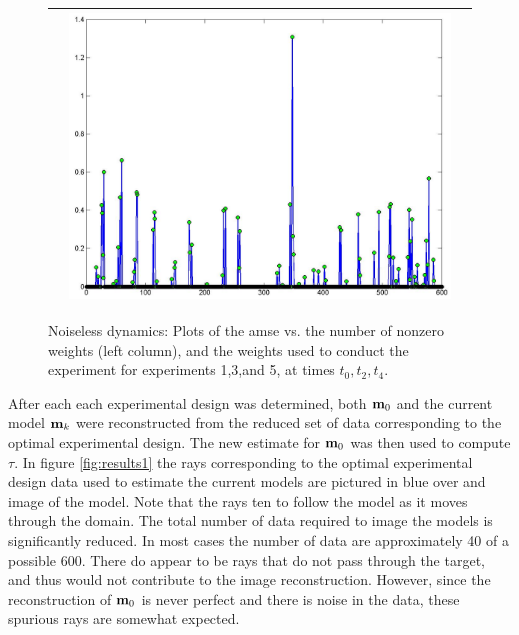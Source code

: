 \documentclass[11pt]{article}
\newcommand{\bfm}	{{\bf{m}}}
\begin{document}
\begin{figure}[!h]
\begin{center}
\begin{tabular}{|c|c|c|}
			&
			\includegraphics[width=.8\iwidth]{figures/newFigs/exp5Weights}\\			
			\hline
		\end{tabular}
	\end{center}
	\caption{Noiseless dynamics: Plots of the {\sf amse} vs. the number of nonzero weights (left column), and the weights used to conduct the experiment for experiments 1,3,and 5, at times $t_0,t_2,t_4$.}
	\label{fig:weights1}
\end{figure}

After each each experimental design was determined, both $\bfm_0$ and the current model $\bfm_k$ were reconstructed from the reduced set of data corresponding to the optimal experimental design. The new estimate for $\bfm_0$ was then used to compute $\tau$. In figure \ref{fig:results1} the rays corresponding to the optimal experimental design data used to estimate the current models are pictured in blue over and image of the model. Note that the rays ten to follow the model as it moves through the domain. The total number of data required to image the models is significantly reduced. In most cases the number of data are approximately 40 of a possible 600. There do appear to be rays that do not pass through the target, and thus would not contribute to the image reconstruction. However, since the reconstruction of $\bfm_0$ is never perfect and there is noise in the data, these spurious rays are somewhat expected. 
\end{document}
